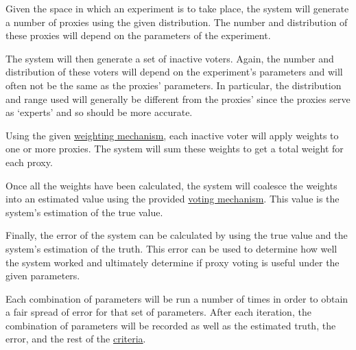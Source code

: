 \begin{enumerate}[label=\textbf{\arabic*}., leftmargin=2\parindent]
    Given the space in which an experiment is to take place, the system will
    generate a number of proxies using the given distribution.
    The number and distribution of these proxies will depend on the
    parameters of the experiment.

    The system will then generate a set of inactive voters.
    Again, the number and distribution of these voters will depend on the
    experiment's parameters and will often not be the same as the proxies'
    parameters.
    In particular, the distribution and range used will generally be
    different from the proxies' since the proxies serve as `experts' and so
    should be more accurate.

    Using the given \hyperref[subsec:weighting-mechanisms]{weighting mechanism},
    each inactive voter will apply weights to one or more proxies.
    The system will sum these weights to get a total weight for each proxy.

    Once all the weights have been calculated, the system will coalesce
    the weights into an estimated value using the provided
    \hyperref[subsec:voting-mechanisms]{voting mechanism}.
    This value is the system's estimation of the true value.

    Finally, the error of the system can be calculated by using the true
    value and the system's estimation of the truth.
    This error can be used to determine how well the system worked and
    ultimately determine if proxy voting is useful under the given parameters.
\end{enumerate}

Each combination of parameters will be run a number of times in order to obtain
a fair spread of error for that set of parameters.
After each iteration, the combination of parameters will be recorded as well
as the estimated truth, the error, and the rest of the
\hyperref[subsec:criteria]{criteria}.


